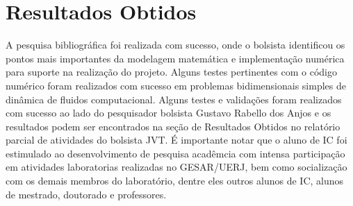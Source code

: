 \documentclass[a4paper,portuges,12pt]{article}
\begin{document}
\section{Resultados Obtidos}

A pesquisa bibliográfica foi realizada com sucesso, onde o bolsista
identificou os pontos mais importantes da modelagem matemática e
implementação numérica para suporte na realização do projeto. Alguns
testes pertinentes com o código numérico foram realizados com sucesso em
problemas bidimensionais simples de dinâmica de fluidos computacional.
Alguns testes e validações foram realizados com sucesso ao lado do
pesquisador bolsista Gustavo Rabello dos Anjos e os resultados podem ser
encontrados na seção de Resultados Obtidos no relatório parcial de
atividades do bolsista JVT. É importante notar que o aluno de IC foi
estimulado ao desenvolvimento de pesquisa acadêmcia com intensa
participação em atividades laboratorias realizadas no GESAR/UERJ, bem
como socialização com os demais membros do laboratório, dentre eles
outros alunos de IC, alunos de mestrado, doutorado e professores.
\end{document}
